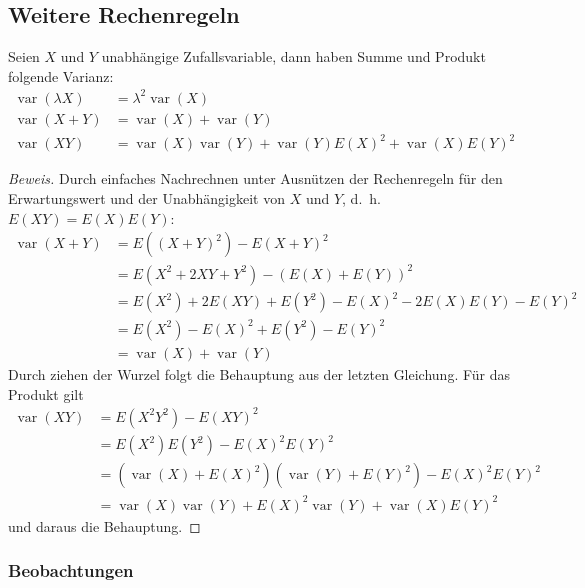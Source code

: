 \subsection{Weitere Rechenregeln}
\begin{satz}
\label{rechenregeln-varianz}
Seien $X$ und $Y$ unabhängige Zufallsvariable, dann haben
Summe und Produkt folgende Varianz:
\begin{align*}
\operatorname{var}(\lambda X)&=\lambda^2\operatorname{var}(X)\\
\operatorname{var}(X+Y)&=\operatorname{var}(X)+\operatorname{var}(Y)\\
\operatorname{var}(XY)&=\operatorname{var}(X)\operatorname{var}(Y)
+
\operatorname{var}(Y)E(X)^2+\operatorname{var}(X)E(Y)^2
\end{align*}
\end{satz}
\begin{proof}[Beweis]Durch einfaches Nachrechnen unter Ausnützen der
Rechenregeln für den Erwartungswert und der
Unabhängigkeit von $X$ und $Y$, d.~h.~$E(XY)=E(X)E(Y)$:
\begin{align*}
\operatorname{var}(X+Y)
&=E((X+Y)^2)-E(X+Y)^2\\
&=E(X^2+2XY+Y^2)-(E(X)+E(Y))^2\\
&=E(X^2)+2E(XY)+E(Y^2)-E(X)^2-2E(X)E(Y)-E(Y)^2\\
&=E(X^2)-E(X)^2+E(Y^2)-E(Y)^2\\
&=\operatorname{var}(X)+\operatorname{var}(Y)
\end{align*}
Durch ziehen der Wurzel folgt die Behauptung aus der letzten Gleichung.
Für das Produkt gilt
\begin{align*}
\operatorname{var}(XY)
&=E(X^2Y^2)-E(XY)^2\\
&=E(X^2)E(Y^2)-E(X)^2E(Y)^2\\
&=(\operatorname{var}(X)+E(X)^2)(\operatorname{var}(Y)+E(Y)^2)
-E(X)^2E(Y)^2\\
&=\operatorname{var}(X)\operatorname{var}(Y)+E(X)^2\operatorname{var}(Y)
+\operatorname{var}(X)E(Y)^2
\end{align*}
und daraus die Behauptung.
\end{proof}

\subsubsection{Beobachtungen}


